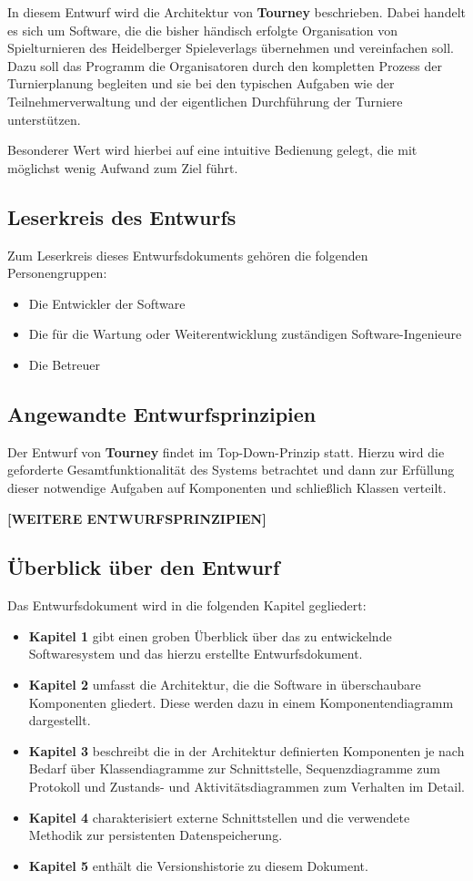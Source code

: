 \documentclass[11pt]{article}
\begin{document}
In diesem Entwurf wird die Architektur von \textbf{Tourney} beschrieben. Dabei handelt es sich um Software, die die bisher händisch erfolgte Organisation von Spielturnieren des Heidelberger Spieleverlags übernehmen und vereinfachen soll. Dazu soll das Programm die Organisatoren durch den kompletten Prozess der Turnierplanung begleiten und sie bei den typischen Aufgaben wie der Teilnehmerverwaltung und der eigentlichen Durchführung der Turniere unterstützen.

Besonderer Wert wird hierbei auf eine intuitive Bedienung gelegt, die mit möglichst wenig Aufwand zum Ziel führt.

\subsection{Leserkreis des Entwurfs}

Zum Leserkreis dieses Entwurfsdokuments gehören die folgenden Personengruppen:
\begin{itemize}
	\item Die Entwickler der Software
	\item Die für die Wartung oder Weiterentwicklung zuständigen Software-Ingenieure
	\item Die Betreuer
\end{itemize}

\subsection{Angewandte Entwurfsprinzipien}

Der Entwurf von \textbf{Tourney} findet im Top-Down-Prinzip statt. Hierzu wird die geforderte Gesamtfunktionalität des Systems betrachtet und dann zur Erfüllung dieser notwendige Aufgaben auf Komponenten und schließlich Klassen verteilt.

\textbf{[WEITERE ENTWURFSPRINZIPIEN]}

\subsection{Überblick über den Entwurf}

Das Entwurfsdokument wird in die folgenden Kapitel gegliedert:
\begin{itemize}
	\item[] \textbf{Kapitel 1} gibt einen groben Überblick über das zu entwickelnde Softwaresystem und das hierzu erstellte Entwurfsdokument.
	\item[] \textbf{Kapitel 2} umfasst die Architektur, die die Software in überschaubare Komponenten gliedert. Diese werden dazu in einem Komponentendiagramm dargestellt.
	\item[] \textbf{Kapitel 3} beschreibt die in der Architektur definierten Komponenten je nach Bedarf über Klassendiagramme zur Schnittstelle, Sequenzdiagramme zum Protokoll und Zustands- und Aktivitätsdiagrammen zum Verhalten im Detail.
	\item[] \textbf{Kapitel 4} charakterisiert externe Schnittstellen und die verwendete Methodik zur persistenten Datenspeicherung.
	\item[] \textbf{Kapitel 5} enthält die Versionshistorie zu diesem Dokument.
\end{itemize}
\end{document}
